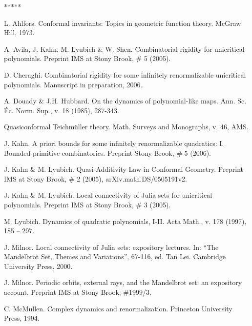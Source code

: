 
\begin{thebibliography}{*****}


 L. Ahlfors. Conformal invariants: Topics in geometric function theory. McGraw Hill, 1973.

 A. Avila, J. Kahn, M. Lyubich \& W. Shen. 
   Combinatorial rigidity for unicritical polynomials. 
   Preprint IMS at Stony Brook, \# 5 (2005).


 D. Cheraghi. Combinatorial rigidity for some infinitely renormalizable
  unicritical polynomials. Manuscript in preparation, 2006.  

 A. Douady \& J.H. Hubbard. On the dynamics of polynomial-like maps.
    Ann. Sc. \'{E}c. Norm. Sup., v. 18 (1985), 287-343.




 Quasiconformal Teichm\"uller theory.
   Math. Surveys and Monographs, v. 46, AMS.

 J. Kahn. A priori bounds for some infinitely renormalizable quadratics: I.
                  Bounded primitive combinatorics. Preprint Stony Brook, \# 5 (2006).   



 J. Kahn \& M. Lyubich.
   Quasi-Additivity Law in Conformal Geometry.
   Preprint IMS at Stony Brook, \# 2 (2005),
   arXiv.math.DS/0505191v2. 

 J. Kahn \& M. Lyubich. 
  Local connectivity of Julia sets for unicritical polynomials. 
   Preprint IMS at Stony Brook, \# 3 (2005). 

 M. Lyubich. Dynamics of quadratic polynomials, I-II. 
   Acta Math., v. 178 (1997), 185 -- 297.



 J. Milnor.
     Local connectivity of Julia sets: expository lectures.
     In: ``The Mandelbrot Set, Themes and Variations'',  67-116, ed. Tan Lei.  
     Cambridge University Press, 2000.

 J. Milnor.
  Periodic orbits, external rays, and the Mandelbrot set: an expository account.
  Preprint IMS at Stony Brook, \#1999/3.

 C. McMullen. Complex dynamics and renormalization.
   Princeton University Press, 1994. 

\end{thebibliography}
